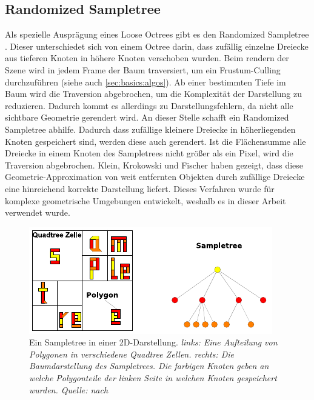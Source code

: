 \subsection{Randomized Sampletree}
\label{sec:basics:sampletree}
Als spezielle Ausprägung eines Loose Octrees gibt es den Randomized Sampletree \cite{klein}. Dieser unterschiedet sich von einem Octree darin, dass zufällig einzelne Dreiecke aus tieferen Knoten in höhere Knoten verschoben  wurden. Beim rendern der Szene wird in jedem Frame der Baum traversiert, um ein Frustum-Culling durchzuführen (siehe auch \ref{sec:basics:algos}). Ab einer bestimmten Tiefe im Baum wird die Traversion abgebrochen, um die Komplexität der Darstellung zu reduzieren. Dadurch kommt es allerdings zu Darstellungsfehlern, da nicht alle sichtbare Geometrie gerendert wird. An dieser Stelle schafft ein Randomized Sampletree abhilfe. Dadurch dass zufällige kleinere Dreiecke in höherliegenden Knoten gespeichert sind, werden diese auch gerendert. Ist die Flächensumme alle Dreiecke in einem Knoten des Sampletrees nicht größer als ein Pixel, wird die Traversion abgebrochen. Klein, Krokowski und Fischer \cite{klein} haben gezeigt, dass diese Geometrie-Approximation von weit entfernten Objekten durch zufällige Dreiecke eine hinreichend korrekte Darstellung liefert. Dieses Verfahren wurde für komplexe geometrische Umgebungen entwickelt, weshalb es in dieser Arbeit verwendet wurde.
\begin{figure}
 \centering
  \includegraphics[scale=1.7]{images/sampletree2.pdf}
  \caption{Ein Sampletree in einer 2D-Darstellung. \textit{links: Eine Aufteilung von Polygonen in verschiedene Quadtree Zellen. rechts: Die Baumdarstellung des Sampletrees. Die farbigen Knoten geben an welche Polygonteile der linken Seite in welchen Knoten gespeichert wurden. Quelle: nach \cite{klein}}}
 \label{fig:basics:sampletree}
\end{figure}

